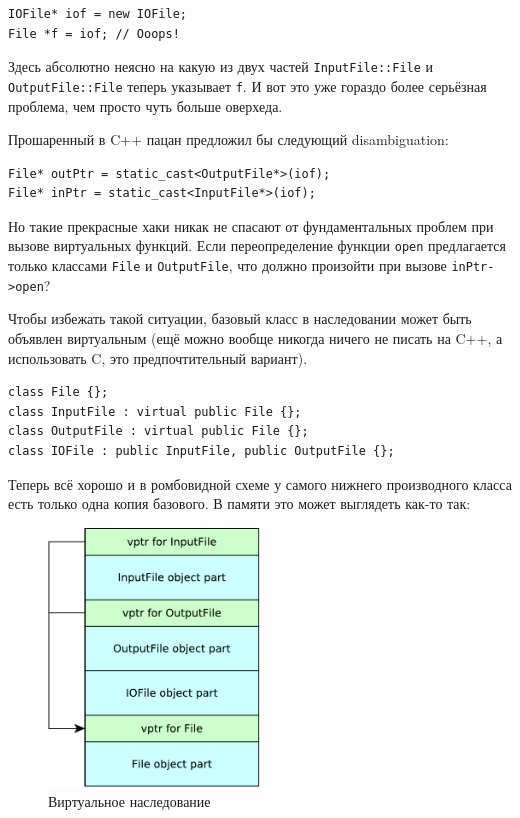 \documentclass[a4paper,12pt,oneside]{article}
\begin{document}
\begin{lstlisting}
IOFile* iof = new IOFile;
File *f = iof; // Ooops!
\end{lstlisting}

Здесь абсолютно неясно на какую из двух частей \lstinline!InputFile::File! и \lstinline!OutputFile::File! теперь указывает \lstinline!f!. И вот это уже гораздо более серьёзная проблема, чем просто чуть больше оверхеда.

Прошаренный в C++ пацан предложил бы следующий disambiguation:

\begin{lstlisting}
File* outPtr = static_cast<OutputFile*>(iof);
File* inPtr = static_cast<InputFile*>(iof);
\end{lstlisting}

Но такие прекрасные хаки никак не спасают от фундаментальных проблем при вызове виртуальных функций. Если переопределение функции \lstinline!open! предлагается только классами \lstinline!File! и \lstinline!OutputFile!, что должно произойти при вызове \lstinline!inPtr->open!?

Чтобы избежать такой ситуации, базовый класс в наследовании может быть объявлен виртуальным (ещё можно вообще никогда ничего не писать на C++, а использовать C, это предпочтительный вариант).

\begin{lstlisting}
class File {};
class InputFile : virtual public File {};
class OutputFile : virtual public File {};
class IOFile : public InputFile, public OutputFile {};
\end{lstlisting}

Теперь всё хорошо и в ромбовидной схеме у самого нижнего производного класса есть только одна копия базового. В памяти это может выглядеть как-то так:

\begin{figure}[h!]
\centering
\includegraphics[width=0.5\textwidth]{illustrations/virtualinh-crop.pdf}
\caption{Виртуальное наследование}
\label{fig:virtualinh-crop}
\end{figure}
\end{document}
